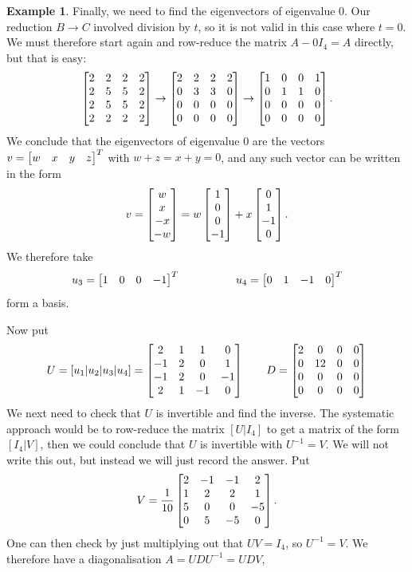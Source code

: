 \documentclass[reqno]{amsart}
\theoremstyle{definition}
\newtheorem{example}[theorem]{Example}
\begin{document}
\begin{example}
 Finally, we need to find the eigenvectors of eigenvalue $0$.  Our
 reduction $B\to C$ involved division by $t$, so it is not valid in
 this case where $t=0$.  We must therefore start again and row-reduce
 the matrix $A-0I_4=A$ directly, but that is easy:
 \[ \left[\begin{matrix} 2&2&2&2 \\ 2&5&5&2 \\ 2&5&5&2 \\ 2&2&2&2 \end{matrix}\right] \to 
    \left[\begin{matrix} 2&2&2&2 \\ 0&3&3&0 \\ 0&0&0&0 \\ 0&0&0&0 \end{matrix}\right] \to 
    \left[\begin{matrix} 1&0&0&1 \\ 0&1&1&0 \\ 0&0&0&0 \\ 0&0&0&0 \end{matrix}\right].  
 \]
 We conclude that the eigenvectors of eigenvalue $0$ are the vectors
 $v=\left[\begin{matrix} w&x&y&z\end{matrix}\right]^T$ with $w+z=x+y=0$, and any such vector can be
 written in the form
 \[ v = \left[\begin{matrix} w \\ x \\ -x \\ -w \end{matrix}\right] 
      = w \left[\begin{matrix} 1 \\ 0 \\ 0 \\ -1 \end{matrix}\right] + 
        x \left[\begin{matrix} 0 \\ 1 \\ -1 \\ 0 \end{matrix}\right].
 \]
 We therefore take 
 \[ u_3 = \left[\begin{matrix} 1&0&0&-1\end{matrix}\right]^T \hspace{5em}
    u_4 = \left[\begin{matrix} 0&1&-1&0\end{matrix}\right]^T
 \]
 form a basis.

 Now put 
 \[ U = [u_1|u_2|u_3|u_4] =
     \left[\begin{matrix} 
       2 & 1 &  1 &  0 \\
      -1 & 2 &  0 &  1 \\
      -1 & 2 &  0 & -1 \\
       2 & 1 & -1 &  0
     \end{matrix}\right]
     \qquad
     D = \left[\begin{matrix}
      2 & 0  & 0 & 0 \\
      0 & 12 & 0 & 0 \\
      0 & 0  & 0 & 0 \\
      0 & 0  & 0 & 0
     \end{matrix}\right]
 \]
 We next need to check that $U$ is invertible and find the inverse.
 The systematic approach would be to row-reduce the matrix $[U|I_4]$
 to get a matrix of the form $[I_4|V]$, then we could conclude that
 $U$ is invertible with $U^{-1}=V$.  We will not write this out, but
 instead we will just record the answer.  Put
 \[ V = \frac{1}{10} \left[\begin{matrix}
         2 & -1 & -1 &  2 \\
         1 &  2 &  2 &  1 \\
         5 &  0 &  0 & -5 \\
         0 &  5 & -5 &  0
        \end{matrix}\right].
 \] 
 One can then check by just multiplying out that $UV=I_4$, so
 $U^{-1}=V$.  We therefore have a diagonalisation $A=UDU^{-1}=UDV$, 
\end{example}
\end{document}
